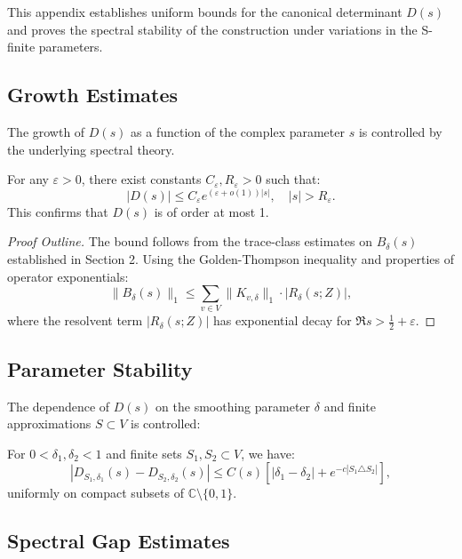 This appendix establishes uniform bounds for the canonical determinant \( D(s) \) and proves the spectral stability of the construction under variations in the S-finite parameters.

\subsection{Growth Estimates}

The growth of \( D(s) \) as a function of the complex parameter \( s \) is controlled by the underlying spectral theory.

\begin{theorem}
For any \( \varepsilon > 0 \), there exist constants \( C_\varepsilon, R_\varepsilon > 0 \) such that:
\[
|D(s)| \leq C_\varepsilon e^{(\varepsilon + o(1))|s|}, \quad |s| > R_\varepsilon.
\]
This confirms that \( D(s) \) is of order at most 1.
\end{theorem}

\begin{proof}[Proof Outline]
The bound follows from the trace-class estimates on \( B_\delta(s) \) established in Section 2. Using the Golden-Thompson inequality and properties of operator exponentials:
\[
\|B_\delta(s)\|_1 \leq \sum_{v \in V} \|K_{v,\delta}\|_1 \cdot |R_\delta(s; Z)|,
\]
where the resolvent term \( |R_\delta(s; Z)| \) has exponential decay for \( \Re s > \frac{1}{2} + \varepsilon \).
\end{proof}

\subsection{Parameter Stability}

The dependence of \( D(s) \) on the smoothing parameter \( \delta \) and finite approximations \( S \subset V \) is controlled:

\begin{proposition}
For \( 0 < \delta_1, \delta_2 < 1 \) and finite sets \( S_1, S_2 \subset V \), we have:
\[
|D_{S_1,\delta_1}(s) - D_{S_2,\delta_2}(s)| \leq C(s) \left[ |\delta_1 - \delta_2| + e^{-c|S_1 \triangle S_2|} \right],
\]
uniformly on compact subsets of \( \mathbb{C} \setminus \{0, 1\} \).
\end{proposition}

\subsection{Spectral Gap Estimates}

